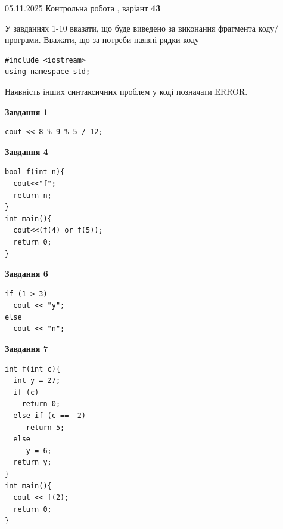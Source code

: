 \documentclass[12pt, ukrainian]{article}
\begin{document}
\newpage

{\Large{05.11.2025 Контрольна робота , варіант  \No \textbf { 43 }\par}}
{
\begin {large}
У завданнях 1-10 вказати, що буде виведено за виконання фрагмента коду/про\-гра\-ми.
Вважати, що за потреби наявні рядки коду
\begin{verbatim}
#include <iostream>
using namespace std;
\end{verbatim}
Наявність інших синтаксичних проблем у коді позначати ERROR.

\begin{minipage}[t]{7.0cm}

\begin{center}
\textbf{Завдання 1}
\end{center}
\vspace{-8mm}

\begin{verbatim}
cout << 8 % 9 % 5 / 12;
\end{verbatim}



\begin{center}
\textbf{Завдання 4}
\end{center}
\vspace{-8mm}

\begin{verbatim}
bool f(int n){
  cout<<"f";
  return n;
}
int main(){
  cout<<(f(4) or f(5));
  return 0;
}
\end{verbatim}



\begin{center}
\textbf{Завдання 6}
\end{center}
\vspace{-8mm}

\begin{verbatim}
if (1 > 3)
  cout << "y";
else
  cout << "n";
\end{verbatim}



\begin{center}
\textbf{Завдання 7}
\end{center}
\vspace{-8mm}

\begin{verbatim}
int f(int c){
  int y = 27;
  if (c)
    return 0;
  else if (c == -2)
     return 5;
  else
     y = 6;
  return y;
}
int main(){
  cout << f(2);
  return 0;
}
\end{verbatim}


\end{minipage}
\end{large}}
\end{document}
